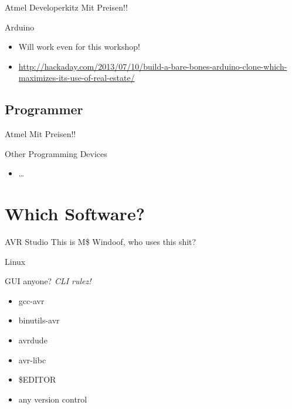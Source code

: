 \documentclass{beamer}
\begin{document}
\begin{frame}{Atmel Developerkitz}
    Mit Preisen!!
\end{frame}

\begin{frame}{Arduino}
    \begin{itemize}
        \item Will work even for this workshop!
        \item \url{http://hackaday.com/2013/07/10/build-a-bare-bones-arduino-clone-which-maximizes-its-use-of-real-estate/}
    \end{itemize}
\end{frame}

\subsection{Programmer}

\begin{frame}{Atmel}
    Mit Preisen!!
\end{frame}

\begin{frame}{Other Programming Devices}
    \begin{itemize}
        \item …
    \end{itemize}
\end{frame}

\section{Which Software?}

\begin{frame}{AVR Studio}
    This is M\$ Windoof, who uses this shit?
\end{frame}

\begin{frame}{Linux}
    \begin{block}{GUI anyone?}
        \emph{CLI rulez!}
    \end{block}
    \begin{itemize}
        \item gcc-avr
        \item binutils-avr
        \item avrdude
        \item avr-libc
        \item \$EDITOR
        \item any version control
    \end{itemize}
\end{frame}
\end{document}

